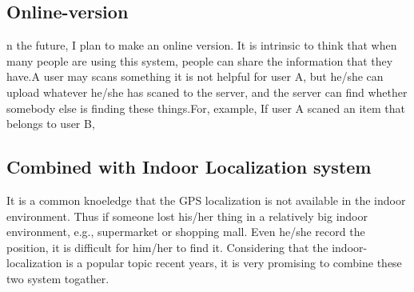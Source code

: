 \documentclass{article}
\begin{document}
\subsection{Online-version}
n the future, I plan to make an online version. It is intrinsic to think that when many people are using this system, people can share the information that they have.A user may scans something it is not helpful for user A, but he/she can upload whatever he/she has scaned to the server, and the server can find whether somebody else is finding these things.For, example, If user A scaned an item that belongs to user B, 
\subsection{Combined with Indoor Localization system}
It is a common knoeledge that the GPS localization is not available in the indoor environment. Thus if someone lost his/her thing in a relatively big indoor environment, e.g., supermarket or shopping mall. Even he/she record the position, it is difficult for him/her to find it. Considering that the indoor-localization is a popular topic recent years, it is very promising to combine these two system togather.
\end{document}
